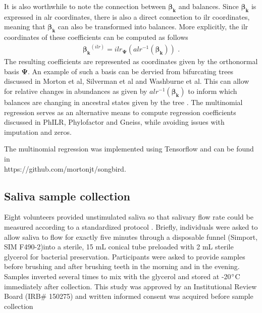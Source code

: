 It is also worthwhile to note the connection between $\boldsymbol{\beta_k}$ and balances. Since $\boldsymbol{\beta_k}$ is expressed in alr coordinates, there is also a direct connection to ilr coordinates, meaning that $\boldsymbol{\beta_k}$ can also be transformed into balances. More explicitly, the ilr coordinates of these coefficients can be computed as follows
\begin{align*}
  \boldsymbol{\beta_k}^{(ilr)} = ilr_{\boldsymbol{\Psi}}(alr^{-1}(\boldsymbol{\beta_k})) \mbox{ .}
\end{align*}
The resulting coefficients are represented as coordinates given by the orthonormal basis $\boldsymbol{\Psi}$. An example of such a basis can be dervied from bifurcating trees discussed in Morton et al\cite{Morton2017-dz}, Silverman et al\cite{Silverman2016-he} and Washburne et al\cite{Washburne2017-up}. This can allow for relative changes in abundances as given by $alr^{-1}(\boldsymbol{\beta_k})$ to inform which balances are changing in ancestral states given by the tree . The multinomial regression serves as an alternative means to compute regression coefficients discussed in PhILR, Phylofactor and Gneiss, while avoiding issues with imputation and zeros.

The multinomial regression was implemented using Tensorflow\cite{abadi2016tensorflow} and can be found in \\
https://github.com/mortonjt/songbird.

\subsection{Saliva sample collection}
Eight volunteers provided unstimulated saliva so that salivary flow rate could be measured according to a standardized protocol \cite{Navazesh2008-me}. Briefly, individuals were asked to allow saliva to flow for exactly five minutes through a disposable funnel (Simport, SIM F490-2)into a sterile, 15 mL conical tube preloaded with 2 mL sterile glycerol for bacterial preservation. Participants were asked to provide samples before brushing and after brushing teeth in the morning and in the evening. Samples inverted several times to mix with the glycerol and stored at -20$\degree$C immediately after collection. This study was approved by an Institutional Review Board (IRB\# 150275) and written informed consent was acquired before sample collection

